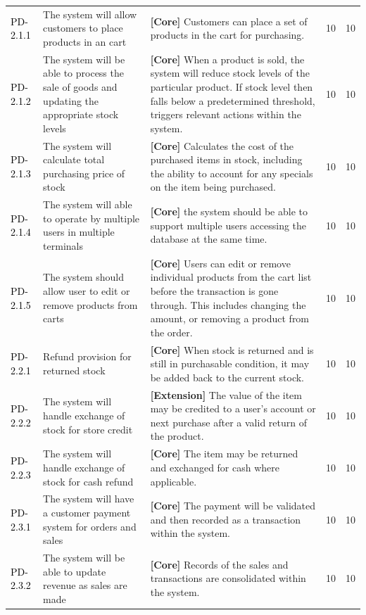 \documentclass[a4paper]{article}
\begin{document}
\begin{longtable}{|l|p{5cm}|p{7cm}|p{0.5cm}|p{0.5cm}|}
\hline
\textcolor{black}{PD-2.1.1} & The system will allow customers to place products in an cart & \textbf{[Core] }Customers can place a set of products in the cart for purchasing.& 10 & 10\\
\textcolor{black}{PD-2.1.2} & The system will be able to process the sale of goods and updating the appropriate stock levels & \textbf{[Core] }When a product is sold, the system will reduce stock levels of the particular product. If stock level then falls below a predetermined threshold, triggers relevant actions within the system.& 10 & 10\\
\textcolor{black}{PD-2.1.3} & The system will calculate total purchasing price of stock & \textbf{[Core] }Calculates the cost of the purchased items in stock, including the ability to account for any specials on the item being purchased.& 10 & 10\\
\textcolor{black}{PD-2.1.4} & The system will able to operate by multiple users in multiple terminals & \textbf{[Core] }the system should be able to support multiple users accessing the database at the same time.& 10 & 10\\
\textcolor{black}{PD-2.1.5} & The system should allow user to edit or remove products from carts & \textbf{[Core] }Users can edit or remove individual products from the cart list before the transaction is gone through. This includes changing the amount, or removing a product from the order.& 10 & 10\\
\hline
\textcolor{black}{PD-2.2.1} & Refund provision for returned stock & \textbf{[Core] }When stock is returned and is still in purchasable condition, it may be added back to the current stock.& 10 & 10\\
\textcolor{black}{PD-2.2.2} & The system will handle exchange of stock for store credit & \textbf{[Extension] }The value of the item may be credited to a user’s account or next purchase after a valid return of the product.& 10 & 10\\
\textcolor{black}{PD-2.2.3} & The system will handle exchange of stock for cash refund & \textbf{[Core] }The item may be returned and exchanged for cash where applicable.& 10 & 10\\
\hline
\textcolor{black}{PD-2.3.1} & The system will have a customer payment system for orders and sales & \textbf{[Core] }The payment will be validated and then recorded as a transaction within the system. & 10 & 10\\
\textcolor{black}{PD-2.3.2} & The system will be able to update revenue as sales are made & \textbf{[Core] }Records of the sales and transactions are consolidated within the system. & 10 & 10\\

\end{longtable}
\end{document}
